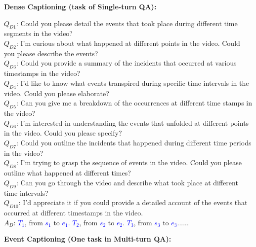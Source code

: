 \documentclass[10pt,twocolumn,letterpaper]{article}
\begin{document}
\begin{figure*}[t] \centering

\begin{tcolorbox}[colback=gray!20, colframe=black, text width=0.9\textwidth, title={Box 3: Templates to transform events $\{s_i, e_i, T_i\}$ into QA dialogues, 10 templates for each task.}]
\hypertarget{box3}{}

\textbf{Dense Captioning (task of Single-turn QA):}

$Q_{D1}$: Could you please detail the events that took place during different time segments in the video? \\ 
$Q_{D2}$: I'm curious about what happened at different points in the video. Could you please describe the events? \\ 
$Q_{D3}$: Could you provide a summary of the incidents that occurred at various timestamps in the video? \\ 
$Q_{D4}$: I'd like to know what events transpired during specific time intervals in the video. Could you please elaborate? \\ 
$Q_{D5}$: Can you give me a breakdown of the occurrences at different time stamps in the video? \\ 
$Q_{D6}$: I'm interested in understanding the events that unfolded at different points in the video. Could you please specify? \\ 
$Q_{D7}$: Could you outline the incidents that happened during different time periods in the video? \\ 
$Q_{D8}$: I'm trying to grasp the sequence of events in the video. Could you please outline what happened at different times? \\ 
$Q_{D9}$: Can you go through the video and describe what took place at different time intervals? \\ 
$Q_{D10}$: I'd appreciate it if you could provide a detailed account of the events that occurred at different timestamps in the video. \\
$A_{D}$: \textcolor{blue}{$T_1$}, from \textcolor{blue}{$s_1$} to \textcolor{blue}{$e_1$}. \textcolor{blue}{$T_2$}, from \textcolor{blue}{$s_2$} to \textcolor{blue}{$e_2$}. \textcolor{blue}{$T_3$}, from \textcolor{blue}{$s_3$} to \textcolor{blue}{$e_3$}...... \\

\tcblower

\textbf{Event Captioning (One task in Multi-turn QA):}


\end{tcolorbox}
\end{figure*}
\end{document}
